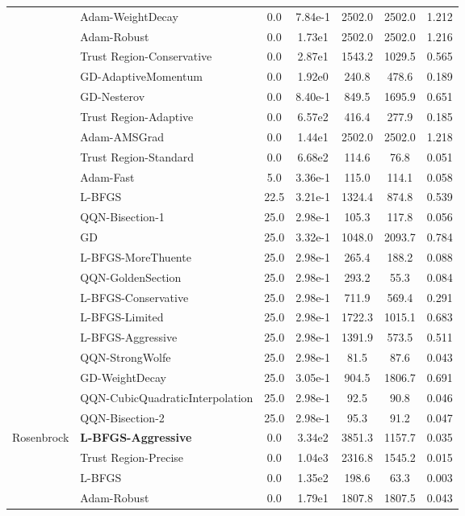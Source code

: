 \documentclass{article}
\begin{document}
\begin{table}[htbp]
{\begin{tabular}{p{2.5cm}p{2.5cm}*{5}{c}}
 & Adam-WeightDecay & 0.0 & 7.84e-1 & 2502.0 & 2502.0 & 1.212 \\
 & Adam-Robust & 0.0 & 1.73e1 & 2502.0 & 2502.0 & 1.216 \\
 & Trust Region-Conservative & 0.0 & 2.87e1 & 1543.2 & 1029.5 & 0.565 \\
 & GD-AdaptiveMomentum & 0.0 & 1.92e0 & 240.8 & 478.6 & 0.189 \\
 & GD-Nesterov & 0.0 & 8.40e-1 & 849.5 & 1695.9 & 0.651 \\
 & Trust Region-Adaptive & 0.0 & 6.57e2 & 416.4 & 277.9 & 0.185 \\
 & Adam-AMSGrad & 0.0 & 1.44e1 & 2502.0 & 2502.0 & 1.218 \\
 & Trust Region-Standard & 0.0 & 6.68e2 & 114.6 & 76.8 & 0.051 \\
 & Adam-Fast & 5.0 & 3.36e-1 & 115.0 & 114.1 & 0.058 \\
 & L-BFGS & 22.5 & 3.21e-1 & 1324.4 & 874.8 & 0.539 \\
 & QQN-Bisection-1 & 25.0 & 2.98e-1 & 105.3 & 117.8 & 0.056 \\
 & GD & 25.0 & 3.32e-1 & 1048.0 & 2093.7 & 0.784 \\
 & L-BFGS-MoreThuente & 25.0 & 2.98e-1 & 265.4 & 188.2 & 0.088 \\
 & QQN-GoldenSection & 25.0 & 2.98e-1 & 293.2 & 55.3 & 0.084 \\
 & L-BFGS-Conservative & 25.0 & 2.98e-1 & 711.9 & 569.4 & 0.291 \\
 & L-BFGS-Limited & 25.0 & 2.98e-1 & 1722.3 & 1015.1 & 0.683 \\
 & L-BFGS-Aggressive & 25.0 & 2.98e-1 & 1391.9 & 573.5 & 0.511 \\
 & QQN-StrongWolfe & 25.0 & 2.98e-1 & 81.5 & 87.6 & 0.043 \\
 & GD-WeightDecay & 25.0 & 3.05e-1 & 904.5 & 1806.7 & 0.691 \\
 & QQN-CubicQuadraticInterpolation & 25.0 & 2.98e-1 & 92.5 & 90.8 & 0.046 \\
 & QQN-Bisection-2 & 25.0 & 2.98e-1 & 95.3 & 91.2 & 0.047 \\
\midrule
\multirow{25}{*}{Rosenbrock} & \textbf{L-BFGS-Aggressive} & 0.0 & 3.34e2 & 3851.3 & 1157.7 & 0.035 \\
 & Trust Region-Precise & 0.0 & 1.04e3 & 2316.8 & 1545.2 & 0.015 \\
 & L-BFGS & 0.0 & 1.35e2 & 198.6 & 63.3 & 0.003 \\
 & Adam-Robust & 0.0 & 1.79e1 & 1807.8 & 1807.5 & 0.043 \\

\end{tabular}}
\end{table}
\end{document}
